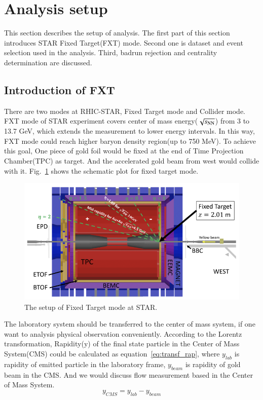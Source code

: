 
\section{Analysis setup}

This section describes the setup of analysis. 
The first part of this section introduces STAR Fixed Target(FXT) mode. 
Second one is dataset and event selection used in the analysis. 
Third, badrun rejection and centrality determination are discussed.

\subsection{Introduction of FXT}

There are two modes at RHIC-STAR, Fixed Target mode and Collider mode. 
FXT mode of STAR experiment covers center of mass energy($\sqrt{s_\text{NN}}$) from 3 to 13.7 GeV, which extends the measurement to lower energy intervals.
In this way, FXT mode could reach higher baryon density region(up to 750 MeV). 
To achieve this goal, One piece of gold foil would be fixed at the end of Time Projection Chamber(TPC) as target.\cite{PhysRevC.103.034908}
And the accelerated gold beam from west would collide with it. Fig.~\ref{fig:FXTmode} shows the schematic plot for fixed target mode.
\begin{figure}[hbt!]
\centering
\includegraphics[width=0.85\linewidth]{figures/chapter01/FXTmode.png}
\caption{The setup of Fixed Target mode at STAR.}
\label{fig:FXTmode}
\end{figure}

The laboratory system should be transferred to the center of mass system, 
if one want to analysis physical observation conveniently. 
According to the Lorentz transformation, Rapidity(y) of the final state particle in the Center of Mass System(CMS) could be calculated as equation~\ref{eq:transf_rap}, 
where $y_{lab}$ is rapidity of emitted particle in the laboratory frame, $y_{beam}$ is rapidity of gold beam in the CMS.
And we would discuss flow measurement based in the Center of Mass System.
\begin{equation}
    y_{CMS} = y_{lab} - y_{beam}
\label{eq:transf_rap}
\end{equation}

